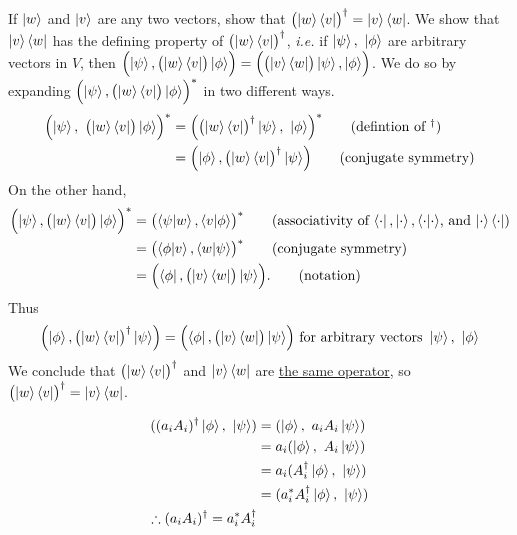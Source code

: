  If $\ket{w}$ and $\ket{v}$ are any two vectors, show that $\bigl(\ket{w}\bra{v}\bigr)^\dagger = \ket{v}\bra{w}$.
\Soln We show that $\ket{v}\bra{w}$ has the defining property of $\bigl(\ket{w}\bra{v}\bigr)^\dagger$, \textit{i.e.} if $\ket{\psi},\ \ket{\phi}$ are arbitrary vectors in $V$, then $\Bigl(\ket{\psi}, \bigl(\ket{w}\bra{v}\bigr)\ket{\phi}\Bigr) = \Bigl(\bigl(\ket{v}\bra{w}\bigr)\ket{\psi}, \ket{\phi}\Bigr)$.  We do so by expanding $\Bigl(\ket{\psi}, \bigl(\ket{w}\bra{v}\bigr)\ket{\phi}\Bigr)^*$ in two different ways. 
\begin{align*}
	\Bigl(\ket{\psi},\ \bigl(\ket{w}\bra{v}\bigr) \ket{\phi}\Bigr)^* &=
	\Bigl(\bigl(\ket{w}\bra{v}\bigr)^\dagger \ket{\psi},\  \ket{\phi}\Bigr)^* \tag{defintion of $^\dagger$}\\
	&= \Bigl(\ket{\phi},\bigl(\ket{w}\bra{v}\bigr)^\dagger \ket{\psi} \Bigr) \tag{conjugate symmetry}
\end{align*}
On the other hand,
\begin{align*}
	\Bigl(\ket{\psi},\bigl(\ket{w}\bra{v}\bigr) \ket{\phi}\Bigr)^*
	&= \bigl(\braket{\psi | w}, \braket{v | \phi}\bigr)^* \tag{associativity of $\bra{\cdot},\ket{\cdot}, \braket{\cdot|\cdot}$, and $\ket{\cdot}\bra{\cdot}$}\\
	&= \bigl(\braket{\phi | v}, \braket{w | \psi}\bigr)^* \tag{conjugate symmetry}\\
	&= \Bigl(\bra{\phi}, \bigl(\ket{v}\bra{w}\bigr)\ket{\psi}\Bigr). \tag{notation}
\end{align*}
Thus
\begin{align*}
	\Bigl(\ket{\phi},\bigl(\ket{w}\bra{v}\bigr)^\dagger \ket{\psi} \Bigr) = \Bigl(\bra{\phi}, \bigl(\ket{v}\bra{w}\bigr)\ket{\psi}\Bigr) \text{ for arbitrary vectors } \ket{\psi},\ \ket{\phi}
\end{align*}
We conclude that $\bigl(\ket{w}\bra{v}\bigr)^\dagger$ and $\ket{v}\bra{w}$ are \underline{the same operator}, so $\bigl(\ket{w}\bra{v}\bigr)^\dagger = \ket{v}\bra{w}$.


\begin{align*}
	( (a_i A_i)^\dagger \ket{\phi},\ \ket{\psi} )
	&= (\ket{\phi},\ a_i A_i \ket{\psi})\\
	&= a_i (\ket{\phi},\ A_i \ket{\psi})\\
	&= a_i (A_i^\dagger \ket{\phi},\ \ket{\psi})\\
	&= (a_i^* A_i^\dagger \ket{\phi},\ \ket{\psi})\\
%
	\therefore (a_i A_i)^\dagger = a_i^* A_i^\dagger
\end{align*}




